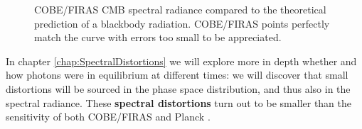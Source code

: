 \begin{figure}[ht]
\caption{COBE/FIRAS \cite{COBE1996} CMB spectral radiance compared to the theoretical prediction of a blackbody radiation. COBE/FIRAS points perfectly match the curve with errors too small to be appreciated.}
\label{fig:COBE/FIRAS_spectrum}
\end{figure}

In chapter \ref{chap:SpectralDistortions} we will explore more in depth whether and how photons were in equilibrium at different times: we will discover that small distortions will be sourced in the phase space distribution, and thus also in the spectral radiance. These \textbf{spectral distortions} turn out to be smaller than the sensitivity of both COBE/FIRAS and Planck \cite{planck2018results}. 
